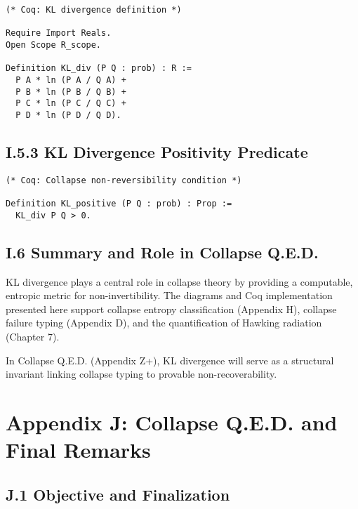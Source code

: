 \documentclass[11pt]{article}
\begin{document}
\begin{lstlisting}
(* Coq: KL divergence definition *)

Require Import Reals.
Open Scope R_scope.

Definition KL_div (P Q : prob) : R :=
  P A * ln (P A / Q A) +
  P B * ln (P B / Q B) +
  P C * ln (P C / Q C) +
  P D * ln (P D / Q D).
\end{lstlisting}

\subsection*{I.5.3 KL Divergence Positivity Predicate}

\begin{lstlisting}
(* Coq: Collapse non-reversibility condition *)

Definition KL_positive (P Q : prob) : Prop :=
  KL_div P Q > 0.
\end{lstlisting}

\subsection*{I.6 Summary and Role in Collapse Q.E.D.}

KL divergence plays a central role in collapse theory by providing a computable, entropic metric for non-invertibility. The diagrams and Coq implementation presented here support collapse entropy classification (Appendix H), collapse failure typing (Appendix D), and the quantification of Hawking radiation (Chapter 7).

In Collapse Q.E.D. (Appendix Z+), KL divergence will serve as a structural invariant linking collapse typing to provable non-recoverability.



\section*{Appendix J: Collapse Q.E.D. and Final Remarks}

\subsection*{J.1 Objective and Finalization}
\end{document}
